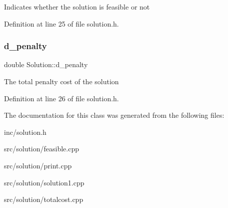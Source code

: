 Indicates whether the solution is feasible or not 

Definition at line 25 of file solution.\+h.

\mbox{\label{class_solution_a553459be3bb9cb467c4482eb9c260815}} 
\subsubsection{\texorpdfstring{d\+\_\+penalty}{d\_penalty}}
{\footnotesize\ttfamily double Solution\+::d\+\_\+penalty\hspace{0.3cm}{\ttfamily [private]}}

The total penalty cost of the solution 

Definition at line 26 of file solution.\+h.



The documentation for this class was generated from the following files\+:\begin{DoxyCompactItemize}
\item 
inc/solution.\+h\item 
src/solution/feasible.\+cpp\item 
src/solution/print.\+cpp\item 
src/solution/solution1.\+cpp\item 
src/solution/totalcost.\+cpp\end{DoxyCompactItemize}
